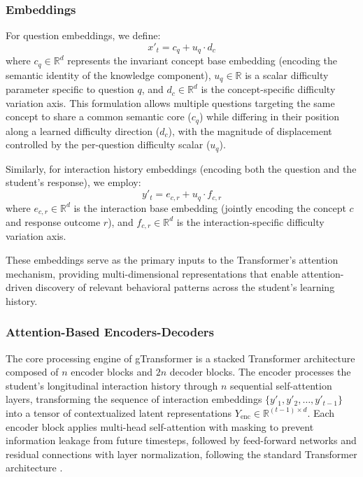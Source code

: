 \documentclass[applsci,article,submit,moreauthors,pdftex]{Definitions/mdpi}
\begin{document}
\subsubsection{Embeddings} \label{sec_embeddings}

For question embeddings, we define:
\begin{equation} \label{eq:task_embedding}
    x'_t = c_q + u_q \cdot d_c
\end{equation}
where $c_q \in \mathbb{R}^{d}$ represents the invariant concept base embedding (encoding the semantic identity of the knowledge component), $u_q \in \mathbb{R}$ is a scalar difficulty parameter specific to question $q$, and $d_c \in \mathbb{R}^{d}$ is the concept-specific difficulty variation axis. This formulation allows multiple questions targeting the same concept to share a common semantic core ($c_q$) while differing in their position along a learned difficulty direction ($d_c$), with the magnitude of displacement controlled by the per-question difficulty scalar ($u_q$).

Similarly, for interaction history embeddings (encoding both the question and the student's response), we employ:
\begin{equation} \label{eq:interaction_embedding}
    y'_t = e_{c,r} + u_q \cdot f_{c,r}
\end{equation}
where $e_{c,r} \in \mathbb{R}^{d}$ is the interaction base embedding (jointly encoding the concept $c$ and response outcome $r$), and $f_{c,r} \in \mathbb{R}^{d}$ is the interaction-specific difficulty variation axis. 

These embeddings serve as the primary inputs to the Transformer's attention mechanism, providing multi-dimensional representations that enable attention-driven discovery of relevant behavioral patterns across the student's learning history.

\subsubsection{Attention-Based Encoders-Decoders} \label{sec_enc_dec}

The core processing engine of gTransformer is a stacked Transformer architecture composed of $n$ encoder blocks and $2n$ decoder blocks. The encoder processes the student's longitudinal interaction history through $n$ sequential self-attention layers, transforming the sequence of interaction embeddings $\{y'_1, y'_2, \ldots, y'_{t-1}\}$ into a tensor of contextualized latent representations $Y_{\text{enc}} \in \mathbb{R}^{(t-1) \times d}$. Each encoder block applies multi-head self-attention with masking to prevent information leakage from future timesteps, followed by feed-forward networks and residual connections with layer normalization, following the standard Transformer architecture \citep{vaswani2017attention}.
\end{document}
